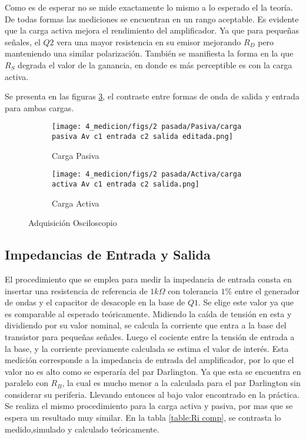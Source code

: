 Como es de esperar no se mide exactamente lo mismo a lo esperado el la teoría. De todas formas las mediciones se encuentran en un rango aceptable. 
Es evidente que la carga activa mejora el rendimiento del amplificador. Ya que para pequeñas señales, el $Q2$ vera una mayor resistencia en su emisor mejorando $R_D$ pero manteniendo una similar polarización. 
También se manifiesta la forma en la que $R_S$ degrada el valor de la ganancia, en donde es más perceptible es con la carga activa. 

Se presenta en las figuras \ref{fig:Av oscilo}, el contraste entre formas de onda de salida y entrada para ambas cargas.


\begin{figure}[ht]
\begin{subfigure}{.45\textwidth}
  \centering
  \texttt{[image: 4\_medicion/figs/2 pasada/Pasiva/carga pasiva Av c1 entrada c2 salida editada.png]}  
  \caption{Carga Pasiva}
  \label{fig:Av carga pasiva}
\end{subfigure}
\begin{subfigure}{.45\textwidth}
  \centering
  \texttt{[image: 4\_medicion/figs/2 pasada/Activa/carga activa Av c1 entrada c2 salida.png]}  
  \caption{Carga Activa}
  \label{fig:Av carga activa}
\end{subfigure}
\caption{Adquisición Osciloscopio}
\label{fig:Av oscilo}
\end{figure}

\subsection{Impedancias de Entrada y Salida}

El procedimiento que se emplea para medir la impedancia de entrada consta en insertar una resistencia de referencia de $1 k\Omega$ con tolerancia $1\%$ entre el generador de ondas y el capacitor de desacople en la base de $Q1$. Se elige este valor ya que es comparable al esperado teóricamente.
Midiendo la caída de tensión en esta y dividiendo por su valor nominal, se calcula la corriente que entra a la base del transistor para pequeñas señales. Luego el cociente entre la tensión de entrada a la base, y la corriente previamente calculada se estima el valor de interés. Esta medición corresponde a la impedancia de entrada del amplificador, por lo que el valor no es alto como se esperaría del par Darlington.
Ya que esta se encuentra en paralelo con $R_B$, la cual es mucho menor a la calculada para el par Darlington sin considerar su periferia. Llevando entonces al bajo valor encontrado en la práctica.
Se realiza el mismo procedimiento para la carga activa y pasiva, por mas que se espera un resultado muy similar. En la tabla \ref{table:Ri comp}, se contrasta lo medido,simulado y calculado teóricamente.

